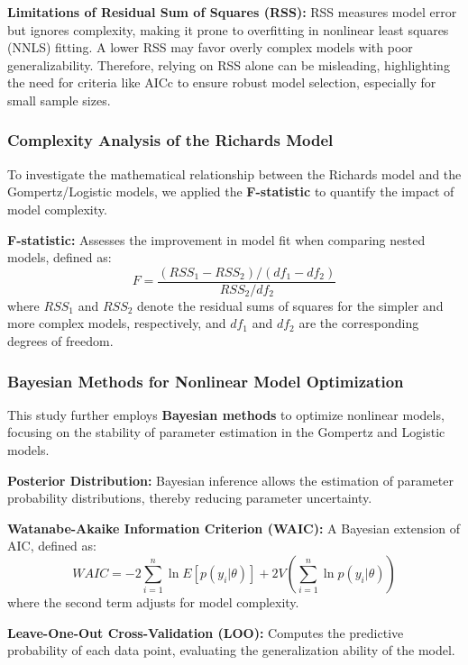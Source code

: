 \documentclass{article}
\begin{document}
\textbf{Limitations of Residual Sum of Squares (RSS):} RSS measures model error but ignores complexity, making it prone to overfitting in nonlinear least squares (NNLS) fitting. A lower RSS may favor overly complex models with poor generalizability. Therefore, relying on RSS alone can be misleading, highlighting the need for criteria like AICc to ensure robust model selection, especially for small sample sizes.


\subsubsection{Complexity Analysis of the Richards Model}

To investigate the mathematical relationship between the Richards model and the Gompertz/Logistic models, we applied the \textbf{F-statistic} to quantify the impact of model complexity.

\textbf{F-statistic:} Assesses the improvement in model fit when comparing nested models, defined as:
\begin{equation}
  F = \frac{(RSS_1 - RSS_2) / (df_1 - df_2)}{RSS_2 / df_2}
\end{equation}
where \( RSS_1 \) and \( RSS_2 \) denote the residual sums of squares for the simpler and more complex models, respectively, and \( df_1 \) and \( df_2 \) are the corresponding degrees of freedom.
\subsubsection{Bayesian Methods for Nonlinear Model Optimization}

This study further employs \textbf{Bayesian methods} to optimize nonlinear models, focusing on the stability of parameter estimation in the Gompertz and Logistic models.

\textbf{Posterior Distribution:} Bayesian inference allows the estimation of parameter probability distributions, thereby reducing parameter uncertainty.

\textbf{Watanabe-Akaike Information Criterion (WAIC):} A Bayesian extension of AIC, defined as:
\begin{equation}
  WAIC = -2 \sum_{i=1}^{n} \ln E[p(y_i | \theta)] + 2 V \left( \sum_{i=1}^{n} \ln p(y_i | \theta) \right)
\end{equation}
where the second term adjusts for model complexity.

\textbf{Leave-One-Out Cross-Validation (LOO):} Computes the predictive probability of each data point, evaluating the generalization ability of the model.
\end{document}
